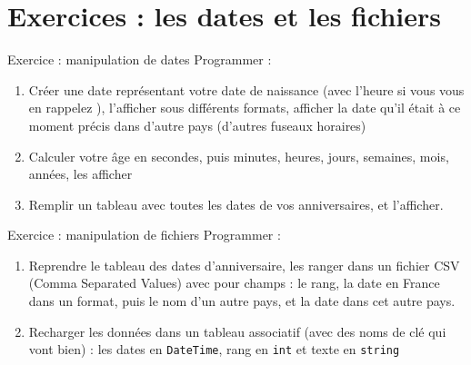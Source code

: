 
\section{Exercices : les dates et les fichiers}

\begin{frame}[containsverbatim]{Exercice  : manipulation de dates}
	Programmer :
	\begin{enumerate}
		\item Créer une date représentant votre date de naissance (avec l’heure si vous vous en rappelez \smiley), l’afficher sous différents formats, afficher la date qu’il était à ce moment précis dans d’autre pays (d’autres fuseaux horaires)
		\item Calculer votre âge en secondes, puis minutes, heures, jours, semaines, mois, années, les afficher
		\item Remplir un tableau avec toutes les dates de vos anniversaires, et l’afficher.
	\end{enumerate}
\end{frame}

\begin{frame}[containsverbatim]{Exercice  : manipulation de fichiers}
	Programmer :
	\begin{enumerate}
		\item Reprendre le tableau des dates d’anniversaire, les ranger dans un fichier CSV (Comma Separated Values) avec pour champs : le rang, la date en France dans un format, puis le nom d’un autre pays, et la date dans cet autre pays.
			\item Recharger les données dans un tableau associatif (avec des noms de clé qui vont bien) : les dates en \texttt{DateTime}, rang en \texttt{int} et texte en \texttt{string}
	\end{enumerate}
\end{frame}
 
